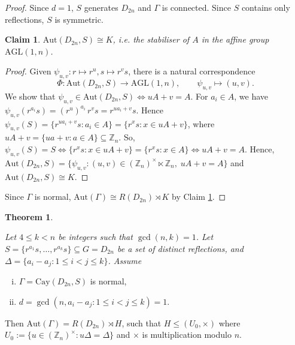 \documentclass[12pt,reqno,a4paper]{amsart}
\theoremstyle{definition}
\newtheorem{thm}[defn]{Theorem}
\newtheorem{claim}[defn]{Claim}
\begin{document}
\begin{proof}
Since $d=1$, $S$ generates $D_{2n}$ and $\Gamma$ is connected. Since $S$ contains only reflections, $S$ is symmetric.

\begin{claim}\label{Claim 4.7}
{\em $\mathrm{Aut}(D_{2n},S)\cong K$,
i.e. the stabiliser of $A$ in the affine group $\mathrm{AGL}(1,n)$.}
\end{claim}

\begin{proof}
Given
$\psi_{u,v}: r\mapsto r^u, s\mapsto r^v s$, there is a natural correspondence
\[
\Phi:\mathrm{Aut}(D_{2n},S)\longrightarrow \mathrm{AGL}(1,n),
\qquad 
\psi_{u,v}\longmapsto (u,v).
\]
We show that
$\psi_{u,v}\in \mathrm{Aut}(D_{2n},S)
\Longleftrightarrow uA+v=A$.
For $a_{i}\in A$, we have $\psi_{u,v}(r^{a_i}s)
 = (r^u)^{a_i} \, r^v s
 = r^{u a_i + v}s$.
Hence $\psi_{u,v}(S)
 = \{r^{u a_i + v}s : a_i \in A\}
 = \{r^{x}s : x \in uA + v\}$,
where $uA + v = \{u a + v : a \in A\} \subseteq \mathbb{Z}_n$.
So,
$
\psi_{u,v}(S) = S
\Longleftrightarrow 
\{r^{x}s : x \in uA + v\}
   = \{r^{x}s : x \in A\}
\Longleftrightarrow
uA + v = A$.
Hence, $\mathrm{Aut}(D_{2n},S)=
\{\psi_{u,v}:(u,v)\in(\mathbb Z_n)^\times\ltimes\mathbb Z_n,\; uA+v=A\}$
and $\mathrm{Aut}(D_{2n},S)\cong K$.
 \end{proof}

Since $\Gamma$ is normal, $\mathrm{Aut}(\Gamma)\cong R(D_{2n})\rtimes K$ by Claim \ref{Claim 4.7}.
 \end{proof}
\begin{thm}\label{Theorem 4.8}
{\em
Let $4\leq k<n$ be integers such that $\gcd(n,k)=1$. Let
$
S=\{r^{a_1}s,\dots,r^{a_k}s\}\subseteq G=D_{2n}
$
be a set of distinct reflections,
and $\Delta=\{a_i-a_j:1\le i<j\le k\}$.
Assume
\begin{enumerate}[(i)]
  \item $\Gamma=\mathrm{Cay}(D_{2n},S)$ is normal,
  \item $d=\gcd(n,a_i-a_j:1\leq i<j\leq k)=1$.
\end{enumerate}
Then
$\mathrm{Aut}(\Gamma)=R(D_{2n})\rtimes H$,
such that $H\leq (U_{0},\times)$ where $U_0:=\{u\in(\mathbb Z_n)^\times : u\Delta=\Delta\}$ and $\times$ is multiplication modulo $n$.
}
\end{thm}
\end{document}
